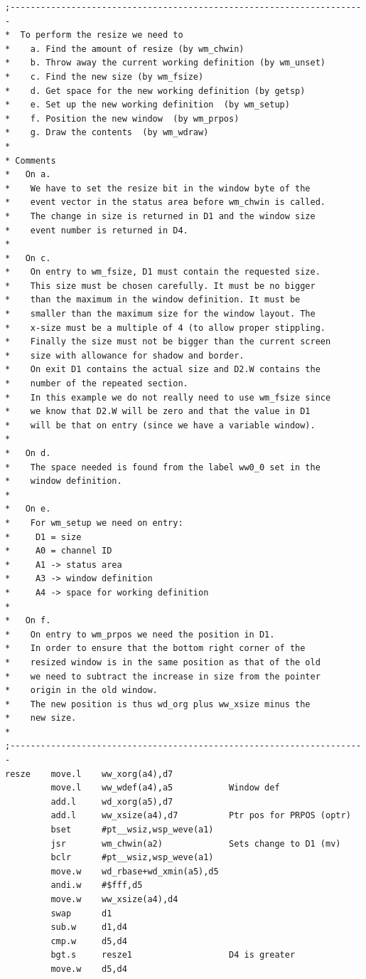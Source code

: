 \begin{lstlisting}[firstnumber=last,caption={Ex0 - SIZE Processing}]
;----------------------------------------------------------------------
*  To perform the resize we need to
*    a. Find the amount of resize (by wm_chwin)
*    b. Throw away the current working definition (by wm_unset)
*    c. Find the new size (by wm_fsize)
*    d. Get space for the new working definition (by getsp)
*    e. Set up the new working definition  (by wm_setup)
*    f. Position the new window  (by wm_prpos)
*    g. Draw the contents  (by wm_wdraw)
*
* Comments
*   On a.
*    We have to set the resize bit in the window byte of the
*    event vector in the status area before wm_chwin is called.
*    The change in size is returned in D1 and the window size
*    event number is returned in D4.
*
*   On c.
*    On entry to wm_fsize, D1 must contain the requested size.
*    This size must be chosen carefully. It must be no bigger
*    than the maximum in the window definition. It must be
*    smaller than the maximum size for the window layout. The
*    x-size must be a multiple of 4 (to allow proper stippling.
*    Finally the size must not be bigger than the current screen
*    size with allowance for shadow and border.
*    On exit D1 contains the actual size and D2.W contains the
*    number of the repeated section.
*    In this example we do not really need to use wm_fsize since
*    we know that D2.W will be zero and that the value in D1
*    will be that on entry (since we have a variable window).
*
*   On d.
*    The space needed is found from the label ww0_0 set in the
*    window definition.
*
*   On e.
*    For wm_setup we need on entry:
*     D1 = size
*     A0 = channel ID
*     A1 -> status area
*     A3 -> window definition
*     A4 -> space for working definition
*
*   On f.
*    On entry to wm_prpos we need the position in D1.
*    In order to ensure that the bottom right corner of the
*    resized window is in the same position as that of the old
*    we need to subtract the increase in size from the pointer
*    origin in the old window.
*    The new position is thus wd_org plus ww_xsize minus the
*    new size.
*
;----------------------------------------------------------------------   
resze    move.l    ww_xorg(a4),d7
         move.l    ww_wdef(a4),a5           Window def
         add.l     wd_xorg(a5),d7
         add.l     ww_xsize(a4),d7          Ptr pos for PRPOS (optr)
         bset      #pt__wsiz,wsp_weve(a1)
         jsr       wm_chwin(a2)             Sets change to D1 (mv)
         bclr      #pt__wsiz,wsp_weve(a1)
         move.w    wd_rbase+wd_xmin(a5),d5
         andi.w    #$fff,d5
         move.w    ww_xsize(a4),d4
         swap      d1
         sub.w     d1,d4
         cmp.w     d5,d4
         bgt.s     resze1                   D4 is greater
         move.w    d5,d4


\end{lstlisting}
